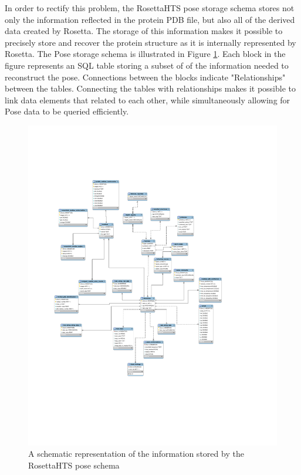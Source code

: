 In order to rectify this problem, the RosettaHTS pose storage schema stores not only the information reflected in the protein \ac{PDB} file, but also all of the derived data created by Rosetta.
The storage of this information makes it possible to precisely store and recover the protein structure as it is internally represented by Rosetta.
The Pose storage schema is illustrated in Figure \ref{fig:pose_schema}.  Each block in the figure represents an \ac{SQL} table storing a subset of 
of the information needed to reconstruct the pose.
Connections between the blocks indicate "Relationships" between the tables.  Connecting the tables with relationships makes it possible to link data elements that related to each other, while simultaneously allowing for Pose data to be queried efficiently.

\begin{figure}
\centering
\includegraphics[width=6in]{figures/mysql/mysql_model.pdf}
\caption{
A schematic representation of the information stored by the RosettaHTS pose schema
}
\label{fig:pose_schema}
\end{figure}

